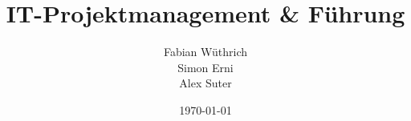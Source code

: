 \documentclass[11pt,a4paper]{scrreprt}
\begin{document}
\titlehead{Hochschule Luzern \\ 
	Technik \& Architektur}
\subject{Zusammenfassung}
\title{IT-Projektmanagement \& Führung}
\subtitle{}
\author{Fabian Wüthrich \\ 
	Simon Erni \\ 
	Alex Suter}
\date{\today}

\maketitle

\tableofcontents


































\end{document}
